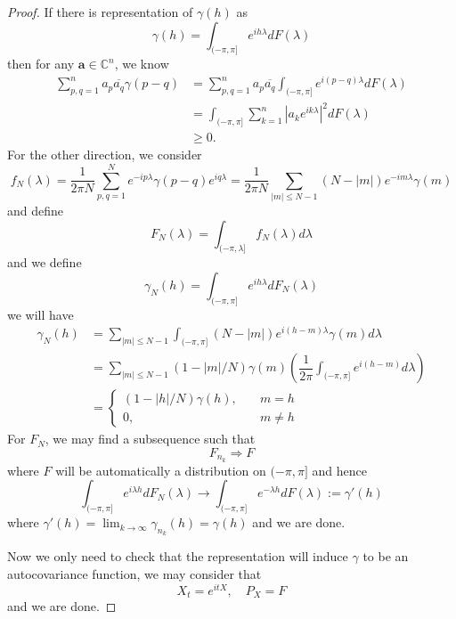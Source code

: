 \begin{proof}
    If there is representation of $\gamma(h)$ as
    \[
    \gamma(h) = \int_{(-\pi,\pi]} e^{ih\lambda}dF(\lambda)
    \]
    then for any $\mathbf{a} \in \mathbb C^n$, we know
    \[
    \begin{aligned}
        \sum\limits_{p,q=1}^n a_p\overline{a_q}\gamma(p-q) &= \sum\limits_{p,q=1}^n a_p\overline{a_q}\int_{(-\pi,\pi]} e^{i(p-q)\lambda}dF(\lambda) \\
        &= \int_{(-\pi,\pi]} \sum\limits_{k=1}^n\left|a_ke^{ik\lambda}\right|^2dF(\lambda) \\
        &\geq 0.
    \end{aligned}
    \]
    For the other direction, we consider 
    \[
    f_N(\lambda) = \dfrac{1}{2\pi N}\sum\limits_{p,q=1}^{N} e^{-ip\lambda}\gamma(p-q)e^{iq\lambda} = \dfrac{1}{2\pi N}\sum\limits_{|m|\leq N-1} (N-|m|)e^{-im\lambda}\gamma(m)
    \]
    and define
    \[
    F_N(\lambda) = \int_{(-\pi,\lambda]} f_N(\lambda)d\lambda
    \]
    and we define
    \[
    \gamma_{N}(h) = \int_{(-\pi,\pi]} e^{ih\lambda}dF_N(\lambda)
    \]
    we will have
    \[
    \begin{aligned}
    \gamma_N(h) &= \sum\limits_{|m|\leq N-1}\int_{(-\pi,\pi]}(N-|m|)e^{i(h-m)\lambda}\gamma(m)d\lambda \\
    &= \sum\limits_{|m|\leq N-1}(1-|m|/N)\gamma(m)\left(\dfrac{1}{2\pi}\int_{(-\pi,\pi]}e^{i(h-m)}d\lambda\right) \\
    &= \begin{cases}
        (1-|h|/N)\gamma(h),\quad &m=h \\
        0,&m\neq h
    \end{cases}
    \end{aligned}
    \]
    For $F_N$, we may find a subsequence such that
    \[
    F_{n_k} \Rightarrow F
    \]
    where $F$ will be automatically a distribution on $(-\pi,\pi]$ and hence
    \[
    \int_{(-\pi,\pi]}e^{i\lambda h}dF_N(\lambda) \to \int_{(-\pi,\pi]} e^{-\lambda h}dF(\lambda) := \gamma'(h)
    \]
    where $\gamma'(h) = \lim_{k\to\infty} \gamma_{n_k}(h) = \gamma(h)$ and we are done.\par
    Now we only need to check that the representation will induce $\gamma$ to be an autocovariance function, we may consider that
    \[
    X_t = e^{itX},\quad P_X = F
    \]
    and we are done.
\end{proof}

